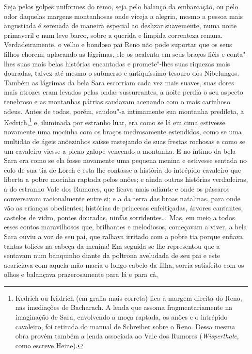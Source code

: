 Seja pelos golpes uniformes do remo, seja pelo balanço da embarcação, ou
pelo odor daquelas margens montanhosas onde viceja a alegria, mesmo a
pessoa mais angustiada é serenada de maneira especial ao deslizar
suavemente, numa noite primaveril e num leve barco, sobre a querida e
límpida correnteza renana. Verdadeiramente, o velho e bondoso pai Reno
não pode suportar que os seus filhos chorem; aplacando as lágrimas, ele
os acalenta em seus braços fiéis e conta"-lhes suas mais belas
histórias encantadas e promete"-lhes suas riquezas mais douradas,
talvez até mesmo o submerso e antiquíssimo tesouro dos Nibelungos.
Também as lágrimas da bela Sara escorriam cada vez mais suaves, suas
dores mais atrozes eram levadas pelas ondas sussurrantes, a noite
perdia o seu aspecto tenebroso e as montanhas pátrias saudavam acenando
com o mais carinhoso adeus. Antes de todas, porém, saudou"-a
intimamente sua montanha predileta, a
Kedrich,\footnote{ Kedrich
ou Kädrich (em grafia mais correta) fica à margem direita do Reno, nas
imediações de Bacharach. A lenda que assoma fragmentariamente na
imaginação de Sara, envolvendo a moça raptada, os anões e o intrépido
cavaleiro, foi retirada do manual de Schreiber sobre o Reno. Dessa
mesma obra provém também a lenda associada ao Vale dos Rumores
(\textit{Wisperthale}, como escreve Heine).}
e, iluminada por estranho luar, era como se lá em cima estivesse
novamente uma mocinha com os braços medrosamente estendidos, como se
uma multidão de ágeis anõezinhos saísse rastejando de suas frestas
rochosas e como se um cavaleiro viesse a pleno galope vencendo a
montanha. E no íntimo da bela Sara era como se ela fosse novamente uma
pequena menina e estivesse sentada no colo de sua tia de Lorch e esta
lhe contasse a história do intrépido cavaleiro que liberta a pobre
mocinha raptada pelos anões; e ainda outras histórias verdadeiras, a do
estranho Vale dos Rumores, que ficava mais adiante e onde os pássaros
conversavam racionalmente entre si; e a da terra das broas natalinas,
para onde vão as crianças obedientes; histórias de princesas
enfeitiçadas, árvores cantantes, castelos de vidro, pontes douradas,
ninfas sorridentes\ldots\ Mas, em meio a todos esses contos maravilhosos
que, brilhantes e melodiosos, começavam a viver, a bela Sara ouviu a
voz de seu pai, que ralhava irritado com a pobre tia porque enfiava
tantas tolices na cabeça da menina! Em seguida se lhe representou que a
sentavam num banquinho diante da poltrona aveludada de seu pai e este
acariciava com aquela mão macia o longo cabelo da filha, sorria
satisfeito com os olhos e balançava prazerosamente para lá e para cá,
